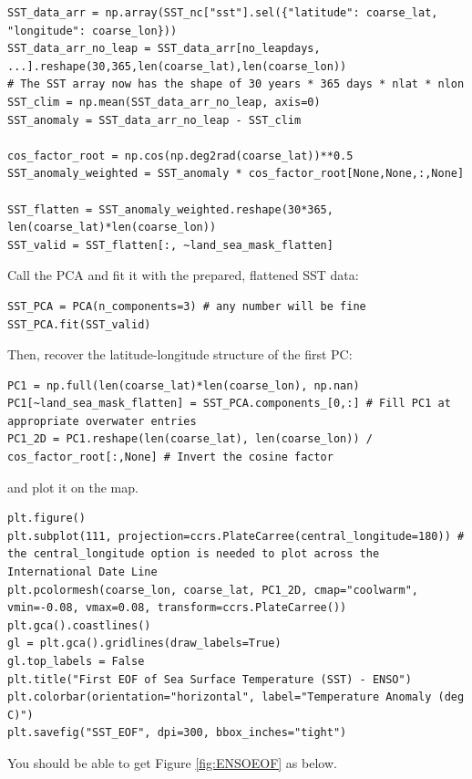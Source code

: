 \begin{lstlisting}
SST_data_arr = np.array(SST_nc["sst"].sel({"latitude": coarse_lat, "longitude": coarse_lon}))
SST_data_arr_no_leap = SST_data_arr[no_leapdays, ...].reshape(30,365,len(coarse_lat),len(coarse_lon))
# The SST array now has the shape of 30 years * 365 days * nlat * nlon
SST_clim = np.mean(SST_data_arr_no_leap, axis=0)
SST_anomaly = SST_data_arr_no_leap - SST_clim

cos_factor_root = np.cos(np.deg2rad(coarse_lat))**0.5
SST_anomaly_weighted = SST_anomaly * cos_factor_root[None,None,:,None]

SST_flatten = SST_anomaly_weighted.reshape(30*365, len(coarse_lat)*len(coarse_lon))
SST_valid = SST_flatten[:, ~land_sea_mask_flatten]
\end{lstlisting}
Call the PCA and fit it with the prepared, flattened SST data:
\begin{lstlisting}
SST_PCA = PCA(n_components=3) # any number will be fine
SST_PCA.fit(SST_valid)
\end{lstlisting}
Then, recover the latitude-longitude structure of the first PC:
\begin{lstlisting}
PC1 = np.full(len(coarse_lat)*len(coarse_lon), np.nan)
PC1[~land_sea_mask_flatten] = SST_PCA.components_[0,:] # Fill PC1 at appropriate overwater entries
PC1_2D = PC1.reshape(len(coarse_lat), len(coarse_lon)) / cos_factor_root[:,None] # Invert the cosine factor
\end{lstlisting}
and plot it on the map.
\begin{lstlisting}
plt.figure()
plt.subplot(111, projection=ccrs.PlateCarree(central_longitude=180)) # the central_longitude option is needed to plot across the International Date Line
plt.pcolormesh(coarse_lon, coarse_lat, PC1_2D, cmap="coolwarm", vmin=-0.08, vmax=0.08, transform=ccrs.PlateCarree())
plt.gca().coastlines()
gl = plt.gca().gridlines(draw_labels=True)
gl.top_labels = False
plt.title("First EOF of Sea Surface Temperature (SST) - ENSO")
plt.colorbar(orientation="horizontal", label="Temperature Anomaly (deg C)")
plt.savefig("SST_EOF", dpi=300, bbox_inches="tight")
\end{lstlisting}
You should be able to get Figure \ref{fig:ENSOEOF} as below.
